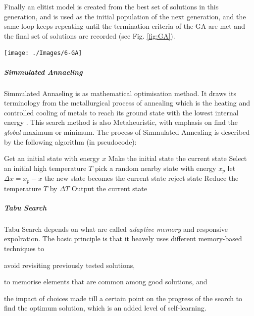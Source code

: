 \documentclass[11pt,a4paper,oneside]{article}
\newenvironment{Figure}		%
	{\par\medskip\noindent\minipage{\linewidth}}
	{\endminipage\par\medskip}
\begin{document}
\begin{multicols}{2}
	Finally an elitist model is created from the best set of solutions in this generation, and is used as the initial population of the next generation, and the same loop keeps repeating until the termination criteria of the GA are met and the final set of solutions are recorded (see Fig. \ref{fig:GA}).

	\begin{Figure}
		\centering
		\texttt{[image: ./Images/6-GA]}
		\label{fig:GA}
	\end{Figure}

	\subparagraph{Simmulated Annaeling}

	Simmulated Annaeling is as mathematical optimisation method. It draws its terminology from the metallurgical process of annealing which is the heating and controlled cooling of metals to reach its ground state with the lowest internal energy \cite{lam88}. This search method is also Metaheuristic, with emphasis on find the \emph{global} maximum or minimum. The process of Simmulated Annealing is described by the following algorithm (in pseudocode):\\
	
		\begin{algorithmic}[1]
			\State Get an initial state with energy $x$
			\State Make the initial state the current state
			\State Select an initial high temperature $T$
				\State pick a random nearby state with energy $x_p$
				\State let $\Delta x = x_p - x$
					\State the new state becomes the current state
				\Else
					\State reject state
				\EndIf
			\EndWhile
			\State Reduce the temperature $T$ by $\Delta T$
			\EndWhile
			\State Output the current state
		\end{algorithmic}

	\subparagraph{Tabu Search}

	Tabu Search depends on what are called \emph{adaptive memory} and {responsive expolration}. The basic principle is that it heavely uses different memory-based techniques to \begin{inparaenum} \item avoid revisiting previously tested solutions, \item to memorise elements that are common among good solutions, and \item the impact of choices made till a certain point on the progress of the search to find the optimum solution, which is an added level of self-learning.\end{inparaenum}


\end{multicols}
\end{document}

